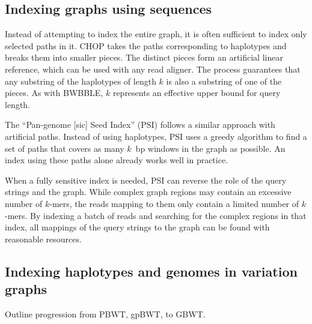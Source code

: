 \subsection{Indexing graphs using sequences}

Instead of attempting to index the entire graph, it is often sufficient to index only selected paths in it.
CHOP \cite{Mokveld_2018} takes the paths corresponding to haplotypes and breaks them into smaller pieces.
The distinct pieces form an artificial linear reference, which can be used with any read aligner.
The process guarantees that any substring of the haplotypes of length $k$ is also a substring of one of the pieces.
As with BWBBLE, $k$ represents an effective upper bound for query length.

The ``Pan-genome [sic] Seed Index'' (PSI) \cite{Ghaffaari_2019} follows a similar approach with artificial paths.
Instead of using haplotypes, PSI uses a greedy algorithm to find a set of paths that covers as many $k$~bp windows in the graph as possible.
An index using these paths alone already works well in practice.

When a fully sensitive index is needed, PSI can reverse the role of the query strings and the graph.
While complex graph regions may contain an excessive number of $k$-mers, the reads mapping to them only contain a limited number of $k$-mers.
By indexing a batch of reads and searching for the complex regions in that index, all mappings of the query strings to the graph can be found with reasonable resources.


\subsection{Indexing haplotypes and genomes in variation graphs}

Outline progression from PBWT, gpBWT, to GBWT.











